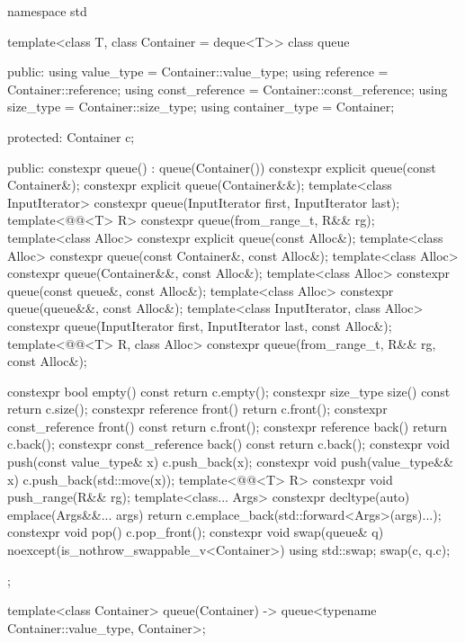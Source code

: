 \begin{codeblock}
namespace std {
  template<class T, class Container = deque<T>>
  class queue {
  public:
    using value_type      = Container::value_type;
    using reference       = Container::reference;
    using const_reference = Container::const_reference;
    using size_type       = Container::size_type;
    using container_type  = Container;

  protected:
    Container c;

  public:
    constexpr queue() : queue(Container()) {}
    constexpr explicit queue(const Container&);
    constexpr explicit queue(Container&&);
    template<class InputIterator> constexpr queue(InputIterator first, InputIterator last);
    template<@@<T> R> constexpr queue(from_range_t, R&& rg);
    template<class Alloc> constexpr explicit queue(const Alloc&);
    template<class Alloc> constexpr queue(const Container&, const Alloc&);
    template<class Alloc> constexpr queue(Container&&, const Alloc&);
    template<class Alloc> constexpr queue(const queue&, const Alloc&);
    template<class Alloc> constexpr queue(queue&&, const Alloc&);
    template<class InputIterator, class Alloc>
      constexpr queue(InputIterator first, InputIterator last, const Alloc&);
    template<@@<T> R, class Alloc>
      constexpr queue(from_range_t, R&& rg, const Alloc&);

    constexpr bool              empty() const     { return c.empty(); }
    constexpr size_type         size()  const     { return c.size(); }
    constexpr reference         front()           { return c.front(); }
    constexpr const_reference   front() const     { return c.front(); }
    constexpr reference         back()            { return c.back(); }
    constexpr const_reference   back() const      { return c.back(); }
    constexpr void push(const value_type& x)      { c.push_back(x); }
    constexpr void push(value_type&& x)           { c.push_back(std::move(x)); }
    template<@@<T> R> constexpr void push_range(R&& rg);
    template<class... Args>
      constexpr decltype(auto) emplace(Args&&... args)
        { return c.emplace_back(std::forward<Args>(args)...); }
    constexpr void pop()                          { c.pop_front(); }
    constexpr void swap(queue& q) noexcept(is_nothrow_swappable_v<Container>)
      { using std::swap; swap(c, q.c); }
  };

  template<class Container>
    queue(Container) -> queue<typename Container::value_type, Container>;

}
\end{codeblock}
